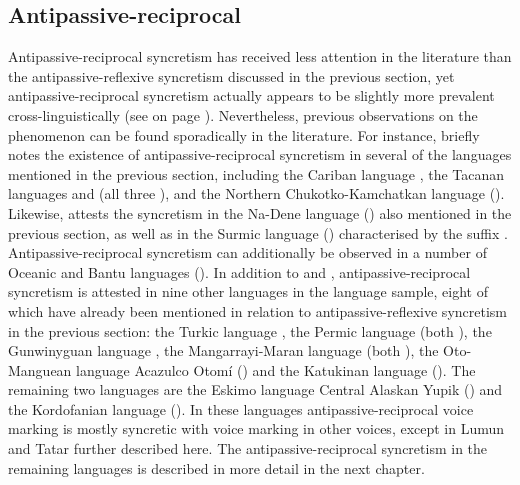 \subsection{Antipassive-reciprocal} \label{sec:simple-syncretism:antp-recp}
Antipassive-reciprocal syncretism has received less attention in the literature than the antipassive-reflexive syncretism discussed in the previous section, yet antipassive-reciprocal syncretism actually appears to be slightly more prevalent cross-linguistically (see  on page \pageref{tab:ch6:voice-syncretism-simplex}). Nevertheless, previous observations on the phenomenon can be found sporadically in the literature. For instance, \cite{janic:2010} briefly notes the existence of antipassive-reciprocal syncretism in several of the languages mentioned in the previous section, including the Cariban language , the Tacanan languages  and  (all three ), and the Northern Chukotko-Kamchatkan language  (). Likewise, \cite{sanso:2017} attests the syncretism in the Na-Dene language  () also mentioned in the previous section, as well as in the Surmic language  () characterised by the suffix . Antipassive-reciprocal syncretism can additionally be observed in a number of Oceanic and Bantu languages (). In addition to  and , antipassive-reciprocal syncretism is attested in nine other languages in the language sample, eight of which have already been mentioned in relation to antipassive-reflexive syncretism in the previous section: the Turkic language , the Permic language  (both ), the Gunwinyguan language , the Mangarrayi-Maran language  (both ), the Oto-Manguean language Acazulco Otomí () and the Katukinan language  (). The remaining two languages are the Eskimo language Central Alaskan Yupik () and the Kordofanian language  (). In these languages antipassive-reciprocal voice marking is mostly syncretic with voice marking in other voices, except in Lumun and Tatar further described here. The antipassive-reciprocal syncretism in the remaining languages is described in more detail in the next chapter.

